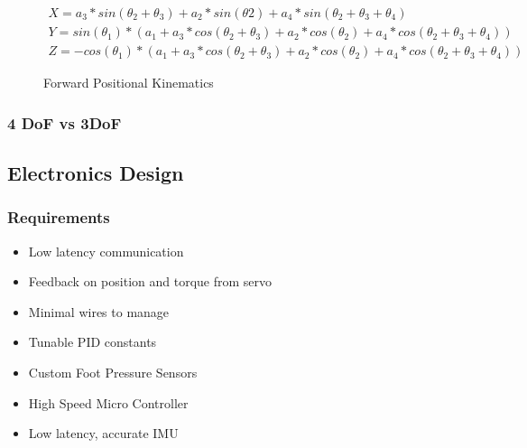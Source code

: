     \begin{figure}[H]
    \centering
    \begin{gather*}
    X = a_3*sin(\theta_2+\theta_3)+a_2*sin(\theta2)+a_4*sin(\theta_2+\theta_3+\theta_4)\\
    Y = sin(\theta_1)*(a_1+a_3*cos(\theta_2+\theta_3)+a_2*cos(\theta_2)+a_4*cos(\theta_2+\theta_3+\theta_4))\\
    Z = -cos(\theta_1)*(a_1+a_3*cos(\theta_2+\theta_3)+a_2*cos(\theta_2)+a_4*cos(\theta_2+\theta_3+\theta_4))
    \end{gather*}
    
    \caption{Forward Positional Kinematics}
    \label{fig:my_label}
    \end{figure}
    

      
    


     \subsubsection{4 DoF vs 3DoF}

\subsection{Electronics Design}

    \subsubsection{Requirements}
        \begin{itemize} %
            \item Low latency communication
            \item Feedback on position and torque from servo
            \item Minimal wires to manage
            \item Tunable PID constants
            \item Custom Foot Pressure Sensors
            \item High Speed Micro Controller
            \item Low latency, accurate IMU
        \end{itemize}
